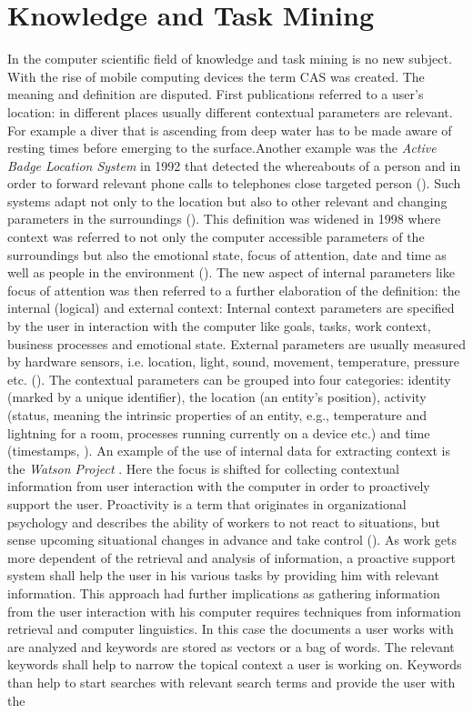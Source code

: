 \section{Knowledge and Task Mining}
\label{knowledgeandtask}
In the computer scientific field of knowledge and task mining is no new subject. With the rise of mobile computing devices the term \ac{CAS} was created. The meaning and definition are disputed. First publications referred to a user's location: in different places usually different contextual parameters are relevant. For example a diver that is ascending from deep water has to be made aware of resting times before emerging to the surface.Another example was the \textit{Active Badge Location System} in 1992 that detected the whereabouts of a person and in order to forward relevant phone calls to telephones close targeted person (\cite{want1992active}). Such systems adapt not only to the location but also to other relevant and changing parameters in the surroundings (\cite{schilit1994context}). This definition was widened in 1998 where context was referred to not only the computer accessible parameters of the surroundings but also the emotional state, focus of attention, date and time as well as people in the environment (\cite{dey1998context}). The new aspect of internal parameters like focus of attention was then referred to a further elaboration of the definition: the internal (logical) and external context: Internal context parameters are specified by the user in interaction with the computer like goals, tasks, work context, business processes and emotional state. External parameters are usually measured by hardware sensors, i.e. location, light, sound, movement, temperature, pressure etc. (\cite{hofer2003context}). The contextual parameters can be grouped into four categories: identity (marked by a unique identifier), the location (an entity’s position), activity (status, meaning the intrinsic properties of an entity, e.g., temperature and lightning for a room, processes running currently on a device etc.) and time (timestamps, \cite{dey2001conceptual}). An example of the use of internal data for extracting context is the \textit{Watson Project} \cite{budzik2000user}. Here the focus is shifted for collecting contextual information from user interaction with the computer in order to proactively support the user. Proactivity is a term that  originates in organizational psychology and describes the ability of workers to not react to situations, but sense upcoming situational changes in advance and take control (\cite{grant2008dynamics}). As work gets more dependent of the retrieval and analysis of information, a proactive support system shall help the user in his various tasks by providing him with relevant information. This approach had further implications as gathering information from the user interaction with his computer requires techniques from information retrieval and computer linguistics. In this case the documents a user works with are analyzed and keywords are stored as vectors or a bag of words. The relevant keywords shall help to narrow the topical context a user is working on. Keywords than help to start searches with relevant search terms and provide the user with the 